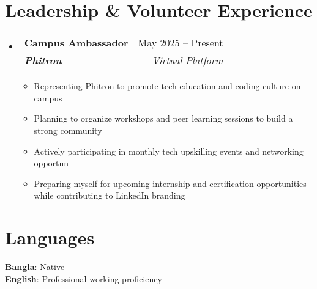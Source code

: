 \documentclass[a4paper,11pt]{article}
\makeatletter
\newcommand{\resumeItem}[1]{
  \item\small{
    {#1 \vspace{-2pt}}
  }
}
\newcommand{\resumeSubheading}[5]{
  \vspace{-2pt}\item
    \begin{tabular*}{0.97\textwidth}[t]{l@{\extracolsep{\fill}}r}
      \textbf{#1} & #2 \\
      \textbf{\textit{\href{#3}{\small #4}}} & \textit{\small #5} \\
    \end{tabular*}\vspace{-7pt}
}
\newcommand{\resumeSubHeadingListStart}{\begin{itemize}[leftmargin=0.15in, label={}]}
\newcommand{\resumeSubHeadingListEnd}{\end{itemize}}
\newcommand{\resumeItemListStart}{\begin{itemize}}
\newcommand{\resumeItemListEnd}{\end{itemize}\vspace{-5pt}}
\makeatother
\begin{document}
\section{\textbf{Leadership \& Volunteer Experience}}
  \resumeSubHeadingListStart
    \resumeSubheading
      {Campus Ambassador}{May 2025 -- Present}
      {https://phitron.io/}{Phitron}{Virtual Platform}
      \resumeItemListStart
        \resumeItem{Representing Phitron to promote tech education and coding culture on campus}
        \resumeItem{Planning to organize workshops and peer learning sessions to build a strong community}
        \resumeItem{Actively participating in monthly tech upskilling events and networking opportun}
        \resumeItem{Preparing myself for upcoming internship and certification opportunities while contributing to LinkedIn branding}
      \resumeItemListEnd
  \resumeSubHeadingListEnd

\section{\textbf{Languages}}
  \begin{itemize}[leftmargin=0.15in, label={}]
    \small{\item{
      \textbf{Bangla}{: Native} \\
      \textbf{English}{: Professional working proficiency}
    }}
  \end{itemize}

\end{document}
